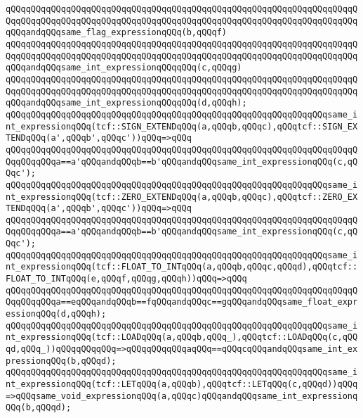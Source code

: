 \verb|qQQqqQQqqQQqqQQqqQQqqQQqqQQqqQQqqQQqqQQqqQQqqQQqqQQqqQQqqQQqqQQqqQQqqQQqqQQqqQQqqQQqqQQqqQQqqQQqqQQqqQQqqQQqqQQqqQQqqQQqqQQqqQQqqQQqqQQqqQQqqQQqandqQQqsame_flag_expressionqQQq(b,qQQqf)|\newline
\verb|qQQqqQQqqQQqqQQqqQQqqQQqqQQqqQQqqQQqqQQqqQQqqQQqqQQqqQQqqQQqqQQqqQQqqQQqqQQqqQQqqQQqqQQqqQQqqQQqqQQqqQQqqQQqqQQqqQQqqQQqqQQqqQQqqQQqqQQqqQQqqQQqandqQQqsame_int_expressionqQQqqQQq(c,qQQqg)|\newline
\verb|qQQqqQQqqQQqqQQqqQQqqQQqqQQqqQQqqQQqqQQqqQQqqQQqqQQqqQQqqQQqqQQqqQQqqQQqqQQqqQQqqQQqqQQqqQQqqQQqqQQqqQQqqQQqqQQqqQQqqQQqqQQqqQQqqQQqqQQqqQQqqQQqandqQQqsame_int_expressionqQQqqQQq(d,qQQqh);|\newline
\newline
\verb|qQQqqQQqqQQqqQQqqQQqqQQqqQQqqQQqqQQqqQQqqQQqqQQqqQQqqQQqqQQqqQQqsame_int_expressionqQQq(tcf::SIGN_EXTENDqQQq(a,qQQqb,qQQqc),qQQqtcf::SIGN_EXTENDqQQq(a',qQQqb',qQQqc'))qQQq=>qQQq|\newline
\verb|qQQqqQQqqQQqqQQqqQQqqQQqqQQqqQQqqQQqqQQqqQQqqQQqqQQqqQQqqQQqqQQqqQQqqQQqqQQqqQQqa==a'qQQqandqQQqb==b'qQQqandqQQqsame_int_expressionqQQq(c,qQQqc');|\newline
\verb|qQQqqQQqqQQqqQQqqQQqqQQqqQQqqQQqqQQqqQQqqQQqqQQqqQQqqQQqqQQqqQQqsame_int_expressionqQQq(tcf::ZERO_EXTENDqQQq(a,qQQqb,qQQqc),qQQqtcf::ZERO_EXTENDqQQq(a',qQQqb',qQQqc'))qQQq=>qQQq|\newline
\verb|qQQqqQQqqQQqqQQqqQQqqQQqqQQqqQQqqQQqqQQqqQQqqQQqqQQqqQQqqQQqqQQqqQQqqQQqqQQqqQQqa==a'qQQqandqQQqb==b'qQQqandqQQqsame_int_expressionqQQq(c,qQQqc');|\newline
\verb|qQQqqQQqqQQqqQQqqQQqqQQqqQQqqQQqqQQqqQQqqQQqqQQqqQQqqQQqqQQqqQQqsame_int_expressionqQQq(tcf::FLOAT_TO_INTqQQq(a,qQQqb,qQQqc,qQQqd),qQQqtcf::FLOAT_TO_INTqQQq(e,qQQqf,qQQqg,qQQqh))qQQq=>qQQq|\newline
\verb|qQQqqQQqqQQqqQQqqQQqqQQqqQQqqQQqqQQqqQQqqQQqqQQqqQQqqQQqqQQqqQQqqQQqqQQqqQQqqQQqa==eqQQqandqQQqb==fqQQqandqQQqc==gqQQqandqQQqsame_float_expressionqQQq(d,qQQqh);|\newline
\verb|qQQqqQQqqQQqqQQqqQQqqQQqqQQqqQQqqQQqqQQqqQQqqQQqqQQqqQQqqQQqqQQqsame_int_expressionqQQq(tcf::LOADqQQq(a,qQQqb,qQQq_),qQQqtcf::LOADqQQq(c,qQQqd,qQQq_))qQQqqQQqqQQq=>qQQqqQQqqQQqaqQQq==qQQqcqQQqandqQQqsame_int_expressionqQQq(b,qQQqd);|\newline
\verb|qQQqqQQqqQQqqQQqqQQqqQQqqQQqqQQqqQQqqQQqqQQqqQQqqQQqqQQqqQQqqQQqsame_int_expressionqQQq(tcf::LETqQQq(a,qQQqb),qQQqtcf::LETqQQq(c,qQQqd))qQQq=>qQQqsame_void_expressionqQQq(a,qQQqc)qQQqandqQQqsame_int_expressionqQQq(b,qQQqd);|\newline

